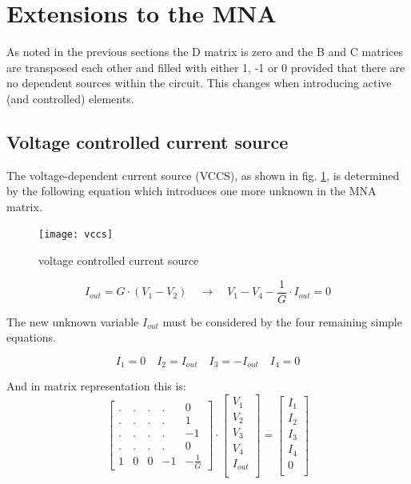 \documentclass[10pt]{report}
\begin{document}
\section{Extensions to the MNA}

As noted in the previous sections the D matrix is zero and the B and C
matrices are transposed each other and filled with either 1, -1 or 0
provided that there are no dependent sources within the circuit.  This
changes when introducing active (and controlled) elements.

\subsection{Voltage controlled current source}

The voltage-dependent current source (VCCS), as shown in fig.
\ref{fig:vccs}, is determined by the following equation which
introduces one more unknown in the MNA matrix.

\begin{figure}[ht]
\begin{center}
\texttt{[image: vccs]}
\end{center}
\caption{voltage controlled current source}
\label{fig:vccs}
\end{figure}
\FloatBarrier

\begin{equation}
I_{out} = G\cdot\left(V_{1} - V_{2}\right)
\quad \rightarrow \quad
V_{1} - V_{4} - \frac{1}{G}\cdot I_{out} = 0
\label{eq:vccs}
\end{equation}

The new unknown variable $I_{out}$ must be considered by the four
remaining simple equations.

\begin{equation}
I_{1} = 0 \quad I_{2} = I_{out} \quad I_{3} = -I_{out} \quad I_{4} = 0
\end{equation}

And in matrix representation this is:
\begin{equation}
\begin{bmatrix}
.&.&.&.& 0\\
.&.&.&.& 1\\
.&.&.&.& -1\\
.&.&.&.& 0\\
1 & 0 & 0 & -1 & -\frac{1}{G}
\end{bmatrix}
\cdot
\begin{bmatrix}
V_{1}\\
V_{2}\\
V_{3}\\
V_{4}\\
I_{out}\\
\end{bmatrix}
=
\begin{bmatrix}
I_{1}\\
I_{2}\\
I_{3}\\
I_{4}\\
0\\
\end{bmatrix}
\end{equation}
\end{document}
